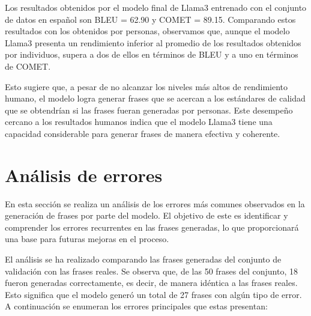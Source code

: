 \documentclass[11pt,spanish,listoffigures,listoftables]{tfgetsinf}
\begin{document}

Los resultados obtenidos por el modelo final de Llama3 entrenado con el conjunto de datos en español son BLEU = 62.90 y COMET = 89.15. Comparando estos resultados con los obtenidos por personas, observamos que, aunque el modelo Llama3 presenta un rendimiento inferior al promedio de los resultados obtenidos por individuos, supera a dos de ellos en términos de BLEU y a uno en términos de COMET.

Esto sugiere que, a pesar de no alcanzar los niveles más altos de rendimiento humano, el modelo logra generar frases que se acercan a los estándares de calidad que se obtendrían si las frases fueran generadas por personas. Este desempeño cercano a los resultados humanos indica que el modelo Llama3 tiene una capacidad considerable para generar frases de manera efectiva y coherente.

\section{Análisis de errores}

En esta sección se realiza un análisis de los errores más comunes observados en la generación de frases por parte del modelo. El objetivo de este es identificar y comprender los errores recurrentes en las frases generadas, lo que proporcionará una base para futuras mejoras en el proceso.

El análisis se ha realizado comparando las frases generadas del conjunto de validación con las frases reales. Se observa que, de las 50 frases del conjunto, 18 fueron generadas correctamente, es decir, de manera idéntica a las frases reales. Esto significa que el modelo generó un total de 27 frases con algún tipo de error. A continuación se enumeran los errores principales que estas presentan:
\end{document}

